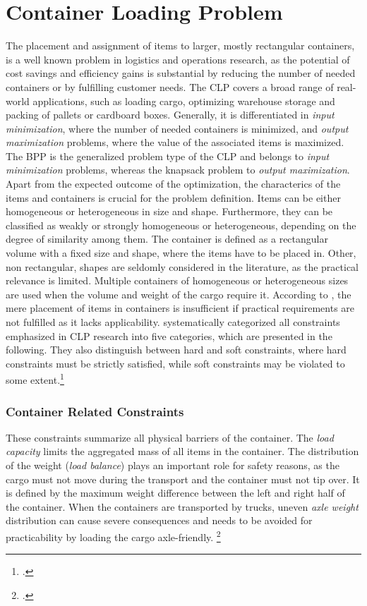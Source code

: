 \section{Container Loading Problem}
\label{sec:clp_definition}

The placement and assignment of items to larger, mostly rectangular
containers, is a well known problem in logistics and operations research, as the
potential of cost savings and efficiency gains is substantial by reducing the number
of needed containers or by fulfilling customer needs. The \gls{CLP} covers a broad range of real-world applications,
such as loading cargo, optimizing warehouse storage and packing of pallets or cardboard boxes.
Generally, it is differentiated in \textit{input minimization},
where the number of needed containers is minimized, and \textit{output maximization} problems,
where the value of the associated items is maximized. The \gls{BPP} is the generalized problem type of the \gls{CLP}
and belongs to \textit{input minimization} problems, whereas the knapsack problem to \textit{output maximization}.
Apart from the expected outcome of the optimization,
the characterics of the items and containers is crucial for the problem definition. Items can be either
homogeneous or heterogeneous in size and shape. Furthermore, they can be classified as weakly or strongly
homogeneous or heterogeneous, depending on the degree of similarity among them. The container is
defined as a rectangular volume with a fixed size and shape, where the items have to be placed in.
Other, non rectangular, shapes are seldomly considered in the literature, as the practical relevance is
limited.
Multiple containers of homogeneous or heterogeneous sizes are used when the volume and weight
of the cargo require it.
According to \textcite{bischoff_issues_1995}, the mere placement of items in containers is insufficient
if practical requirements are not fulfilled as it lacks applicability.
\textcite{bortfeldt_constraints_2013} systematically categorized all constraints emphasized in \gls{CLP} research
into five categories, which are presented in the following. They also distinguish between hard and soft constraints,
where hard constraints must be strictly satisfied, while soft constraints may be violated
to some extent.\footcites(cf.)()[p. 1f]{bortfeldt_constraints_2013}[p. 1f]{bischoff_issues_1995}

\subsubsection{Container Related Constraints}
These constraints summarize all physical barriers of the container. The \textit{load capacity} limits the aggregated
mass of all items in the container. The distribution of the weight (\textit{load balance})
plays an important role for safety reasons, as the cargo must not move during the transport and the container
must not tip over. It is defined by the maximum weight difference between the left and right half of the container.
When the containers are transported by trucks, uneven \textit{axle weight} distribution can cause severe
consequences and needs to be avoided for practicability by loading the cargo axle-friendly. \footcite[cf.][p. 849f]{krebs_advanced_2021}

